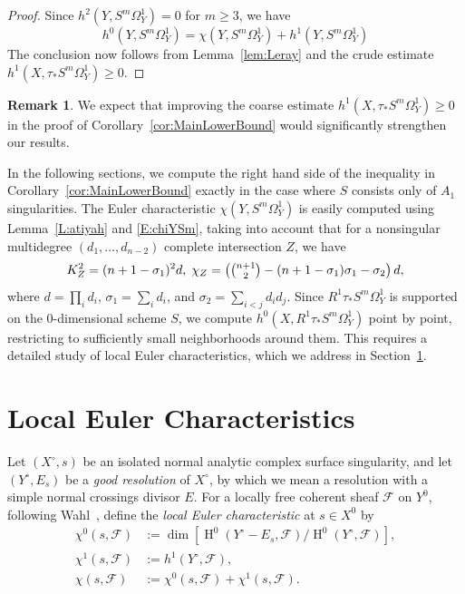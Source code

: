 \documentclass[12pt, reqno]{amsart}
\theoremstyle{definition}
\newtheorem{remark}[lemma]{Remark}
\newcommand{\calFA}{{\mathcal F}}
\DeclareMathOperator{\HH}{H}
\numberwithin{equation}{section}
\numberwithin{table}{section}
\newcommand{\defi}[1]{\emph{#1}} %
\begin{document}
\begin{proof}
Since $h^2(Y,S^m\Omega_Y^1) = 0$ for $m\geq 3$, we have
\[
h^0(Y,S^m\Omega_Y^1) = \chi(Y,S^m\Omega_Y^1) + h^1(Y,S^m\Omega_Y^1)
\]
The conclusion now follows from Lemma~\ref{lem:Leray} and the crude estimate $h^1(X,\tau_*S^m\Omega^1_Y) \geq 0$.
\end{proof}

\begin{remark}
We expect that improving the coarse estimate $h^1(X,\tau_*S^m\Omega^1_Y) \geq 0$ in the proof of Corollary~\ref{cor:MainLowerBound} would significantly strengthen our results. 
\end{remark}

In the following sections, we compute the right hand side of the inequality in Corollary~\ref{cor:MainLowerBound} exactly in the case where $S$ consists only of $A_1$ singularities. The Euler characteristic $\chi(Y,S^m\Omega_Y^1)$ is easily computed using Lemma~\ref{L:atiyah} and \eqref{E:chiYSm}, taking into account that for a nonsingular multidegree $(d_1,\ldots,d_{n-2})$ complete intersection $Z$, we have
\[K_Z^2=(n+1-\sigma_1)^2d,\; \chi_Z=\left(\tbinom{n+1}{2}-(n+1-\sigma_1)\sigma_1-\sigma_2\right)d,\]
where $d=\prod_id_i$, $\sigma_1=\sum_i d_i$, and $\sigma_2=\sum_{i<j} d_id_j$. Since $R^1\tau_*S^m\Omega^1_Y$ is supported on the $0$-dimensional scheme $S$, we compute $h^0(X,R^1\tau_*S^m\Omega^1_Y)$ point by point, restricting to sufficiently small neighborhoods around them. This requires a detailed study of local Euler characteristics, which we address in Section~\ref{S:local_euler_char}.


\section{Local Euler Characteristics}
\label{S:local_euler_char}
Let $(X^\circ,s)$ be an isolated normal analytic complex surface singularity, and let $(Y^\circ,E_s)$ be a \defi{good resolution} of $X^\circ$, by which we mean a resolution with a simple normal crossings divisor $E$.  For a locally free coherent sheaf $\calFA$ on $Y^0$, following Wahl~\cite{Wahl1993}, define the \defi{local Euler characteristic} at $s \in X^0$ by
\begin{equation}
\label{eq:localEuler}
\begin{split}
\chi^0(s,\calFA) &:= \dim\left[\HH^0(Y^\circ - E_s,\calFA)/\HH^0(Y^\circ,\calFA)\right],\\
\chi^1(s,\calFA) &:= h^1(Y^\circ,\calFA),\\
\chi(s,\calFA) &:= \chi^0(s,\calFA)+\chi^1(s,\calFA).
\end{split}
\end{equation}
\end{document}
